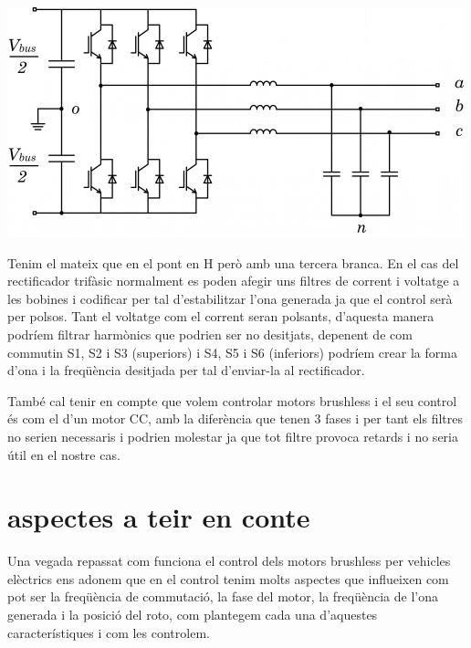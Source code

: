 \includegraphics[width=\textwidth]{ilustracion-1-13281.jpg}\bigskip

Tenim el mateix que en el pont en H però amb una tercera branca. En el cas del rectificador trifàsic normalment es poden afegir uns filtres de corrent i voltatge a les bobines i codificar per tal d'estabilitzar l'ona generada ja que el control serà per polsos. Tant el voltatge com el corrent seran polsants, d'aquesta manera podríem filtrar harmònics que podrien ser no desitjats, depenent de com commutin S1, S2 i S3 (superiors) i S4, S5 i S6 (inferiors) podríem crear la forma d'ona i la freqüència desitjada per tal d'enviar-la al rectificador.

També cal tenir en compte que volem controlar motors brushless i el seu control és com el d'un motor CC, amb la diferència que tenen 3 fases i per tant els filtres no serien necessaris i podrien molestar ja que tot filtre provoca retards i no seria útil en el nostre cas.

\section{aspectes a teir en conte}
Una vegada repassat com funciona el control dels motors brushless per vehicles elèctrics ens adonem que en el control tenim molts aspectes que influeixen com pot ser la freqüència de commutació, la fase del motor, la freqüència de l'ona generada i la posició del roto, com plantegem cada una d'aquestes característiques i com les controlem.

